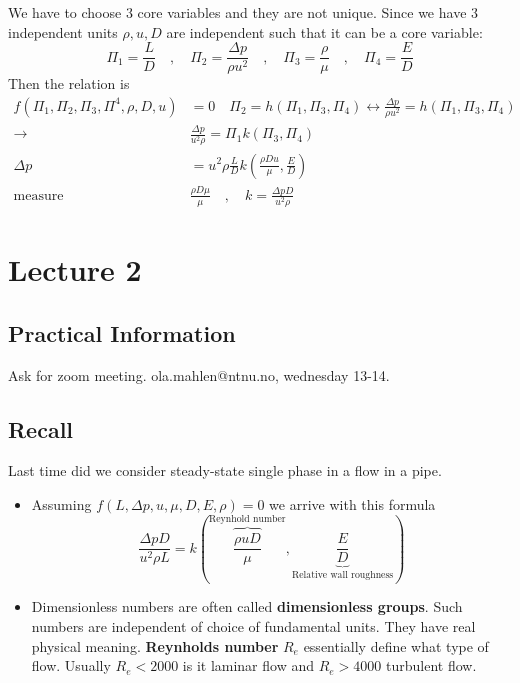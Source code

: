 \documentclass{article}
\theoremstyle{remark}
\begin{document}
We have to choose $3$ core variables and they are not unique.  Since we have $3$ independent units $\rho , u, D$ are independent such that it can be a core variable: \[
\Pi _{1} = \frac{L}{D} \quad , \quad  \Pi _{2} = \frac{\Delta p}{\rho u^2} \quad , \quad \Pi _{3} = \frac{\rho}{\mu} \quad , \quad  \Pi _{4} = \frac{E}{D}    
\] 
Then the relation is \[
  \begin{split}
    f\left( \Pi _{1}, \Pi _{2} , \Pi _3, \Pi ^{4},\rho, D, u \right) &= 0  \quad  \Pi _{2} = h\left( \Pi _{1}, \Pi _{3}, \Pi _{4} \right) \leftrightarrow \frac{\Delta p}{\rho u^2} = h\left( \Pi _{1}, \Pi _3 , \Pi _{4} \right) \\
    \to  & \frac{\Delta p}{ u^2 \rho} = \Pi _{1} k\left( \Pi _{3}, \Pi _{4} \right)\\
    \Delta p &= u^2 \rho \frac{L}{D} k \left( \frac{\rho D u}{\mu}, \frac{E}{D} \right)   \\
    \text{measure} \quad & \frac{\rho D \mu}{ \mu} \quad ,\quad    k= \frac{\Delta p D }{u^2\rho}
  \end{split}
\]
\newpage
\section{Lecture 2}%
\label{sec:lecture_2}
\subsection{Practical Information }%
\label{sub:practical_information_2}

Ask for zoom meeting. ola.mahlen@ntnu.no, wednesday 13-14.

\subsection{Recall}%
\label{sub:repetition}

Last time did we consider steady-state single phase in a flow  in a pipe.
\begin{itemize}
  \item Assuming $f\left( L, \Delta p, u, \mu , D ,E , \rho \right) = 0$ we arrive with this formula \[
  \frac{\Delta p D}{u^{2} \rho L}  = k \left( \overbrace{\frac{\rho u D}{\mu }}^\text{Reynhold number}  , \underbrace{\frac{E}{D}}_\text{Relative wall roughness}  \right)
  \] 
\item Dimensionless numbers are often called \textbf{dimensionless groups}. Such numbers are independent of choice of fundamental units. They have real physical meaning. \textbf{Reynholds number}  $R_{e} $ essentially define what type of flow. Usually $R_{e} < 2000$ is it laminar flow and $R_{e} > 4000$ turbulent flow.
\end{itemize}
\end{document}
